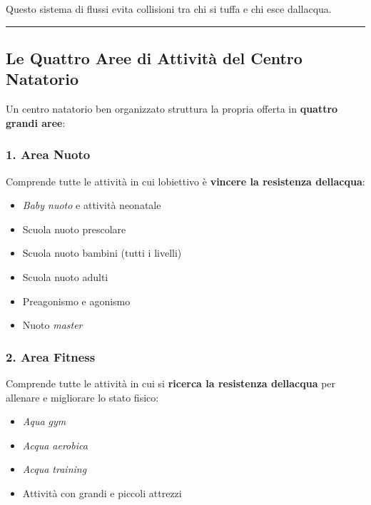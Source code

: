 \documentclass[a4paper,11pt]{article}
\providecommand{\tightlist}{%
  \setlength{\itemsep}{0pt}\setlength{\parskip}{0pt}}
\begin{document}
Questo sistema di flussi evita collisioni tra chi si tuffa e chi esce
dall\textquotesingle acqua.

\begin{center}\rule{0.5\linewidth}{0.5pt}\end{center}

\subsection{Le Quattro Aree di Attività del Centro
      Natatorio}\label{le-quattro-aree-di-attivituxe0-del-centro-natatorio}

Un centro natatorio ben organizzato struttura la propria offerta in
\textbf{quattro grandi aree}:

\subsubsection{1. Area Nuoto}\label{area-nuoto}

Comprende tutte le attività in cui l\textquotesingle obiettivo è
\textbf{vincere la resistenza dell\textquotesingle acqua}:

\begin{itemize}
      \tightlist
      \item
            \emph{Baby nuoto} e attività neonatale
      \item
            Scuola nuoto prescolare
      \item
            Scuola nuoto bambini (tutti i livelli)
      \item
            Scuola nuoto adulti
      \item
            Preagonismo e agonismo
      \item
            Nuoto \emph{master}
\end{itemize}

\subsubsection{2. Area Fitness}\label{area-fitness}

Comprende tutte le attività in cui si \textbf{ricerca la resistenza
      dell\textquotesingle acqua} per allenare e migliorare lo stato fisico:

\begin{itemize}
      \tightlist
      \item
            \emph{Aqua gym}
      \item
            \emph{Acqua aerobica}
      \item
            \emph{Acqua training}
      \item
            Attività con grandi e piccoli attrezzi
\end{itemize}
\end{document}
